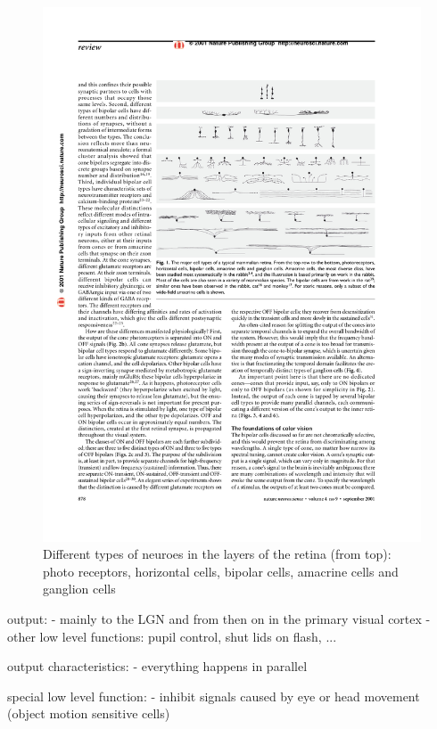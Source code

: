 		
		\begin{figure}[H]
			\centering
			\captionsetup{justification=centering,margin=0.5cm}
			\includegraphics[width=\textwidth, trim=6.2cm 15.7cm 2cm 4cm, clip]{images/masland-2001-neuron-types.pdf}
			\caption{Different types of neuroes in the layers of the retina (from top): photo receptors, horizontal cells, bipolar cells, amacrine cells and ganglion cells \citep{masland2001fundamental}}
		\end{figure}
		
		output:
			- mainly to the LGN and from then on in the primary visual cortex
			- other low level functions: pupil control, shut lids on flash, ...
		
		output characteristics:
			- everything happens in parallel
			
		special low level function:
			- inhibit signals caused by eye or head movement (object motion sensitive cells)

